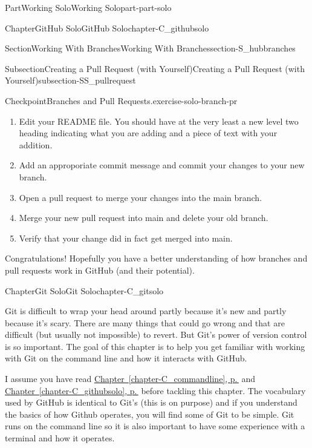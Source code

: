 \documentclass[twoside,10pt,]{book}
\newcommand{\xreffont}{\relax}
\begin{document}
\begin{partptx}{Part}{Working Solo}{}{Working Solo}{}{}{part-part-solo}
\begin{chapterptx}{Chapter}{GitHub Solo}{}{GitHub Solo}{}{}{chapter-C_githubsolo}
\begin{sectionptx}{Section}{Working With Branches}{}{Working With Branches}{}{}{section-S_hubbranches}
\begin{subsectionptx}{Subsection}{Creating a Pull Request (with Yourself)}{}{Creating a Pull Request (with Yourself)}{}{}{subsection-SS_pullrequest}
\begin{inlineexercise}{Checkpoint}{Branches and Pull Requests.}{exercise-solo-branch-pr}
\begin{enumerate}[font=\bfseries,label=(\alph*),ref=\alph*]
\item{}Edit your README file. You should have at the very least a new level two heading indicating what you are adding and a piece of text with your addition.%
\item{}Add an approporiate commit message and commit your changes to your new branch.%
\item{}Open a pull request to merge your changes into the main branch.%
\item{}Merge your new pull request into main and delete your old branch.%
\item{}Verify that your change did in fact get merged into main.%
\end{enumerate}%
\end{inlineexercise}%
\end{subsectionptx}
\begin{conclusion}{}%
Congratulations! Hopefully you have a better understanding of how branches and pull requests work in GitHub (and their potential).%
\end{conclusion}%
\end{sectionptx}
\end{chapterptx}
%
\typeout{************************************************}
\typeout{************************************************}
%
\begin{chapterptx}{Chapter}{Git Solo}{}{Git Solo}{}{}{chapter-C_gitsolo}
\renewcommand*{\chaptername}{Chapter}
%
%
\begin{introduction}{}%
Git is difficult to wrap your head around partly because it's new and partly because it's scary. There are many things that could go wrong and that are difficult (but usually not impossible) to revert. But Git's power of version control is so important. The goal of this chapter is to help you get familiar with working with Git on the command line and how it interacts with GitHub.%
\par
I assume you have read \hyperref[chapter-C_commandline]{Chapter~{\xreffont\ref{chapter-C_commandline}}, p.\,\pageref{chapter-C_commandline}} and \hyperref[chapter-C_githubsolo]{Chapter~{\xreffont\ref{chapter-C_githubsolo}}, p.\,\pageref{chapter-C_githubsolo}} before tackling this chapter. The vocabulary used by GitHub is identical to Git's (this is on purpose) and if you understand the basics of how Github operates, you will find some of Git to be simple. Git runs on the command line so it is also important to have some experience with a terminal and how it operates.%

\end{introduction}
\end{chapterptx}
\end{partptx}
\end{document}
